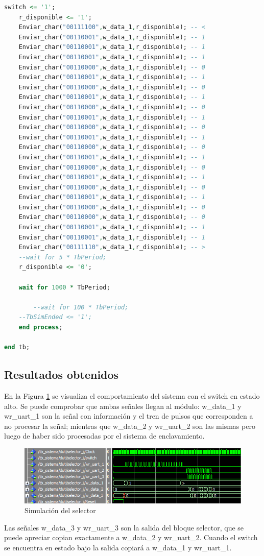 \begin{lstlisting}[language = vhdl,caption=Testbench del módulo selector,label={lst:test_selector}]
	switch <= '1';
	r_disponible <= '1';
	Enviar_char("00111100",w_data_1,r_disponible); -- < 	
	Enviar_char("00110001",w_data_1,r_disponible); -- 1 	
	Enviar_char("00110001",w_data_1,r_disponible); -- 1
 	Enviar_char("00110001",w_data_1,r_disponible); -- 1 	
	Enviar_char("00110000",w_data_1,r_disponible); -- 0
	Enviar_char("00110001",w_data_1,r_disponible); -- 1 	
	Enviar_char("00110000",w_data_1,r_disponible); -- 0
	Enviar_char("00110001",w_data_1,r_disponible); -- 1 	
	Enviar_char("00110000",w_data_1,r_disponible); -- 0
	Enviar_char("00110001",w_data_1,r_disponible); -- 1 	
	Enviar_char("00110000",w_data_1,r_disponible); -- 0
	Enviar_char("00110001",w_data_1,r_disponible); -- 1 	
	Enviar_char("00110000",w_data_1,r_disponible); -- 0
	Enviar_char("00110001",w_data_1,r_disponible); -- 1 	
	Enviar_char("00110000",w_data_1,r_disponible); -- 0
	Enviar_char("00110001",w_data_1,r_disponible); -- 1 	
	Enviar_char("00110000",w_data_1,r_disponible); -- 0
	Enviar_char("00110001",w_data_1,r_disponible); -- 1 	
	Enviar_char("00110000",w_data_1,r_disponible); -- 0
	Enviar_char("00110000",w_data_1,r_disponible); -- 0	
	Enviar_char("00110001",w_data_1,r_disponible); -- 1 
	Enviar_char("00110001",w_data_1,r_disponible); -- 1 	
	Enviar_char("00111110",w_data_1,r_disponible); -- >
	--wait for 5 * TbPeriod;
	r_disponible <= '0';
	
	wait for 1000 * TbPeriod;

        --wait for 100 * TbPeriod;
	--TbSimEnded <= '1';
    end process;
	
end tb;
		\end{lstlisting}
			
	\subsection{Resultados obtenidos}
				
		En la Figura \ref{fig:Test_Selector} se visualiza el comportamiento del sistema con el switch en estado alto. Se puede comprobar que ambas señales llegan al módulo: w\_data\_1 y wr\_uart\_1 son la señal con información y el tren de pulsos que corresponden a no procesar la señal; mientras que w\_data\_2 y wr\_uart\_2 son las mismas pero luego de haber sido procesadas por el sistema de enclavamiento.
			
	\begin{figure}[h]
	\centering
	\includegraphics[scale=0.95]{./Figures/Test/Selector}
		\caption{Simulación del selector}
		\label{fig:Test_Selector}
	\end{figure}
	
	\vspace{5cm}
			
	Las señales w\_data\_3 y wr\_uart\_3 son la salida del bloque selector, que se puede apreciar copian exactamente a w\_data\_2 y wr\_uart\_2. Cuando el switch se encuentra en estado bajo la salida copiará a w\_data\_1 y wr\_uart\_1.
